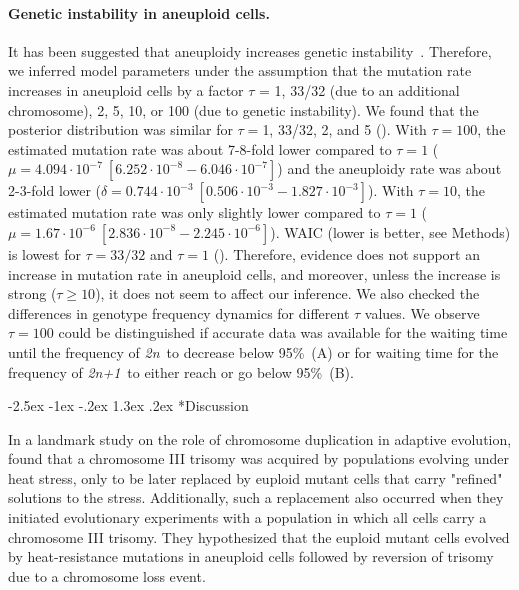 \documentclass[12pt]{extarticle}
\makeatletter
\renewcommand\section{\@startsection {section}{1}{\z@}%
     {-2.5ex \@plus -1ex \@minus -.2ex}%
     {1.3ex \@plus.2ex}%
    {\Large\bfseries}}
\newcommand{\euwt}{\emph{2n}}
\newcommand{\anwt}{\emph{2n+1}}
\makeatother
\begin{document}
\paragraph{Genetic instability in aneuploid cells.}
It has been suggested that aneuploidy increases genetic instability~\citep{Sheltzer2011b, Ippolito2021b}. Therefore, we inferred model parameters under the assumption that the mutation rate increases in aneuploid cells by a factor $\tau$ = 1, 33/32 (due to an additional chromosome), 2, 5, 10, or 100 (due to genetic instability).
We found that the posterior distribution was similar for $\tau=$1, 33/32, 2, and 5 ().
With $\tau=100$, the estimated mutation rate was about 7-8-fold lower compared to $\tau=1$ ($\mu=4.094\cdot10^{-7}\ [6.252\cdot10^{-8}-6.046\cdot10^{-7}]$) and the aneuploidy rate was about 2-3-fold lower ($\delta=0.744\cdot10^{-3}\ [0.506\cdot10^{-3}-1.827\cdot10^{-3}]$). 
With $\tau=10$, the estimated mutation rate was only slightly lower compared to $\tau=1$ ($\mu=1.67\cdot10^{-6}\ [2.836\cdot10^{-8}-2.245\cdot10^{-6}]$). 
WAIC (lower is better, see Methods) is lowest for $\tau=33/32$ and $\tau=1$ ().
Therefore, evidence does not support an increase in mutation rate in aneuploid cells, and moreover, unless the increase is strong ($\tau \ge 10$), it does not seem to affect our inference.
We also checked the differences in genotype frequency dynamics for different $\tau$ values. We observe $\tau=100$ could be distinguished if accurate data was available for the waiting time until the frequency of \euwt\ to decrease below 95\%~(A) or for waiting time for the frequency of \anwt\ to either reach or go below 95\%~(B).


\section*{Discussion}

In a landmark study on the role of chromosome duplication in adaptive evolution, 
\citet{Yona2012} found that a chromosome III trisomy was acquired by \yeast populations evolving under heat stress, only to be later replaced by euploid mutant cells that carry "refined" solutions to the stress. 
Additionally, such a replacement also occurred when they initiated evolutionary experiments with a population in which all cells carry a chromosome III trisomy.
They hypothesized that the euploid mutant cells evolved by heat-resistance mutations in aneuploid cells followed by reversion of trisomy due to a chromosome loss event. 
\end{document}
